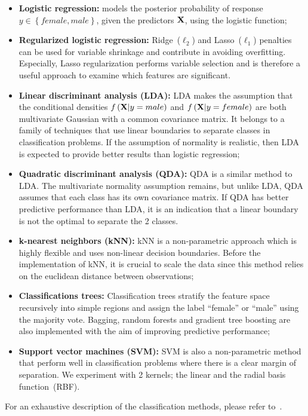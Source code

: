 \begin{itemize}
	\item \textbf{Logistic regression:} models the posterior probability of response $y\in \left\lbrace female, male \right\rbrace$, given the predictors $\mathbf{X}$, using the logistic function;
	
	\item \textbf{Regularized logistic regression:} Ridge~($\ell_2$) and Lasso~($\ell_1$) penalties can be used for variable shrinkage and contribute in avoiding overfitting. Especially, Lasso regularization performs variable selection and is therefore a useful approach to examine which features are significant.
	
	\item \textbf{Linear discriminant analysis (LDA):} LDA makes the assumption that the conditional densities $f \left(\mathbf{X}|y=male \right)$ and $ f \left(\mathbf{X}|y=female \right)$ are both multivariate Gaussian with a common covariance matrix. 
	It belongs to a family of techniques that use linear boundaries to separate classes in classification problems. 
	If the assumption of normality is realistic, then LDA is expected to provide better results than logistic regression;
	
	\item \textbf{Quadratic discriminant analysis (QDA):} QDA is a similar method to LDA. 
	The multivariate normality assumption remains, but unlike LDA, QDA assumes that each class has its own covariance matrix. 
	If QDA has better predictive performance than LDA, it is an indication that a linear boundary is not the optimal to separate the 2 classes.
	
	\item \textbf{k-nearest neighbors (kNN):} kNN is a non-parametric approach which is highly flexible and uses non-linear decision boundaries. 
	Before the implementation of kNN, it is crucial to scale the data since this method relies on the euclidean distance between observations;
	
	\item \textbf{Classifications trees:} Classification trees stratify the feature space recursively into simple regions and assign the label ``female'' or ``male'' using the majority vote. 
	Bagging, random forests and gradient tree boosting are also implemented with the aim of improving predictive performance;
	
	\item \textbf{Support vector machines (SVM):} SVM is also a non-parametric method that perform well in classification problems where there is a clear margin of separation. We experiment with \num{2} kernels; the linear and the radial basis function~(RBF).
\end{itemize}
For an exhaustive description of the classification methods, please refer to~\cite{ESL_2001}.
